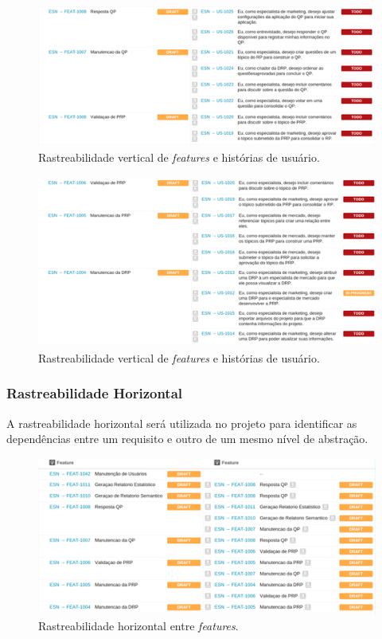 		\begin{figure}[!htp]
			\centering
			\includegraphics{imagens/featus2.png}
			\caption{Rastreabilidade vertical de \textit{features} e histórias de usuário.}
			\label{imagem}
		\end{figure}

		\begin{figure}[!htp]
			\centering
			\includegraphics{imagens/featus3.png}
			\caption{Rastreabilidade vertical de \textit{features} e histórias de usuário.}
			\label{imagem}
		\end{figure}

	\newpage
	\subsubsection{Rastreabilidade Horizontal}
	A rastreabilidade horizontal será utilizada no projeto para identificar as dependências entre um requisito e outro de um mesmo nível de abstração.\\

		\begin{figure}[!htp]
			\centering
			\includegraphics{imagens/featfeat.png}
			\caption{Rastreabilidade horizontal entre \textit{features}.}
			\label{imagem}
		\end{figure}
